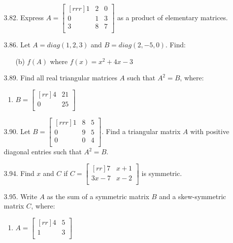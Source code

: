 \documentclass[12pt]{article}
\begin{document}
\begin{enumerate}
\begin{enumerate}
	\end{enumerate}


\item [3.82.] Express $A= \begin{bmatrix}[rrr] 1 & 2 & 0\\ 0 & 1 & 3\\ 3 & 8 & 7\\ \end{bmatrix}$ as a product of elementary matrices.\\


\item [3.86.] Let $A=diag(1,2,3)$ and $B=diag(2,-5,0)$. Find:
	\begin{enumerate}
	\item [(b)] $f(A)$ where $f(x)=x^2+4x-3$
	
	\end{enumerate}


\item [3.89.] Find all real triangular matrices $A$ such that $A^2=B$, where:
	\begin{enumerate}
	\item $B= \begin{bmatrix}[rr] 4 & 21\\ 0 & 25\\ \end{bmatrix}$\\
	\end{enumerate}


\item [3.90.] Let $B= \begin{bmatrix}[rrr] 1 & 8 & 5\\ 0 & 9 & 5\\ 0 & 0 & 4\\ \end{bmatrix}$. Find a triangular matrix $A$ with positive diagonal entries such that $A^2=B$.\\


\item [3.94.] Find $x$ and $C$ if $C= \begin{bmatrix}[rr] 7 & x+1\\ 3x-7 & x-2\\ \end{bmatrix}$ is symmetric.\\


\item [3.95.] Write $A$ as the sum of a symmetric matrix $B$ and a skew-symmetric matrix $C$, where:
	\begin{enumerate}
	\item $A= \begin{bmatrix}[rr] 4 & 5\\ 1 & 3\\ \end{bmatrix}$\\


\end{enumerate}
\end{enumerate}
\end{document}
